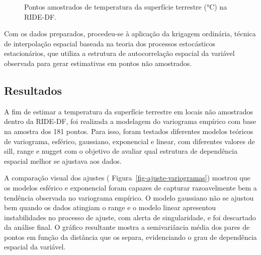\documentclass[
  letterpaper,
  DIV=11,
  numbers=noendperiod]{scrartcl}
\begin{document}
\label{cell-fig-pontos-amostrados}
\begin{figure}[H]


\caption{\label{fig-pontos-amostrados}Pontos amostrados de temperatura
da superfície terrestre (°C) na RIDE-DF.}

\end{figure}%

Com os dados preparados, procedeu-se à aplicação da krigagem ordinária,
técnica de interpolação espacial baseada na teoria dos processos
estocásticos estacionários, que utiliza a estrutura de autocorrelação
espacial da variável observada para gerar estimativas em pontos não
amostrados.

\subsection{Resultados}\label{resultados}

A fim de estimar a temperatura da superfície terrestre em locais não
amostrados dentro da RIDE-DF, foi realizada a modelagem do variograma
empírico com base na amostra dos 181 pontos. Para isso, foram testados
diferentes modelos teóricos de variograma, esférico, gaussiano,
exponencial e linear, com diferentes valores de sill, range e nugget com
o objetivo de avaliar qual estrutura de dependência espacial melhor se
ajustava aos dados.

A comparação visual dos ajustes ( Figura~\ref{fig-ajuste-variogramas})
mostrou que os modelos esférico e exponencial foram capazes de capturar
razoavelmente bem a tendência observada no variograma empírico. O modelo
gaussiano não se ajustou bem quando os dados atingiam o range e o modelo
linear apresentou instabilidades no processo de ajuste, com alerta de
singularidade, e foi descartado da análise final. O gráfico resultante
mostra a semivariância média dos pares de pontos em função da distância
que os separa, evidenciando o grau de dependência espacial da variável.
\end{document}
